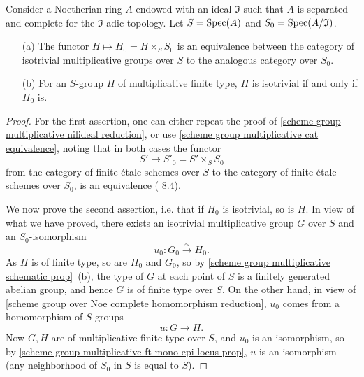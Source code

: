 \begin{theorem}\label{scheme group isotrivial multiplicative over Noe complete reduction}
Consider a Noetherian ring $A$ endowed with an ideal $\mathfrak{I}$ such that $A$ is separated and complete for the $\mathfrak{I}$-adic topology. Let $S=\mathrm{Spec}(A)$ and $S_0=\mathrm{Spec}(A/\mathfrak{I})$.
\begin{enumerate}
    \item[(a)] The functor $H\mapsto H_0=H\times_SS_0$ is an equivalence between the category of isotrivial multiplicative groups over $S$ to the analogous category over $S_0$.
    \item[(b)] For an $S$-group $H$ of multiplicative finite type, $H$ is isotrivial if and only if $H_0$ is.
\end{enumerate}
\end{theorem}
\begin{proof}
For the first assertion, one can either repeat the proof of \cref{scheme group multiplicative nilideal reduction}, or use \cref{scheme group multiplicative cat equivalence}, noting that in both cases the functor
\[S'\mapsto S'_0=S'\times_SS_0\]
from the category of finite \'etale schemes over $S$ to the category of finite \'etale schemes over $S_0$, is an equivalence (\cite{SGA1}  8.4).\par
We now prove the second assertion, i.e. that if $H_0$ is isotrivial, so is $H$. In view of what we have proved, there exists an isotrivial multiplicative group $G$ over $S$ and an $S_0$-isomorphism
\[u_0:G_0\stackrel{\sim}{\to} H_0.\]
As $H$ is of finite type, so are $H_0$ and $G_0$, so by \cref{scheme group multiplicative schematic prop}~(b), the type of $G$ at each point of $S$ is a finitely generated abelian group, and hence $G$ is of finite type over $S$. On the other hand, in view of \cref{scheme group over Noe complete homomorphism reduction}, $u_0$ comes from a homomorphism of $S$-groups
\[u:G\to H.\]
Now $G,H$ are of multiplicative finite type over $S$, and $u_0$ is an isomorphism, so by \cref{scheme group multiplicative ft mono epi locus prop}, $u$ is an isomorphism (any neighborhood of $S_0$ in $S$ is equal to $S$).
\end{proof}

